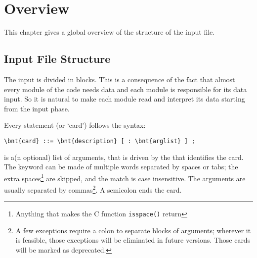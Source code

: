 %
%
%
%
%
% 
%
%

\chapter{Overview}\label{sec:OVERVIEW}
This chapter gives a global overview of the structure of the input file.


\section{Input File Structure}
The input is divided in blocks.
This is a consequence of the fact that almost every module of the code 
needs data and each module is responsible for its data input. 
So it is natural to make each module read and interpret its data starting 
from the input phase.

Every statement (or `card') follows the syntax:
\begin{Verbatim}[commandchars=\\\{\}]
    \bnt{card} ::= \bnt{description} [ : \bnt{arglist} ] ;
\end{Verbatim}
 is a(n optional) list of arguments, that is driven by the 
 that identifies the card. 
The keyword can be made of multiple words separated by spaces or tabs; 
the extra spaces\footnote{
	Anything that makes the C function \texttt{isspace()} 
	return 
} are skipped, and the match is case insensitive. 
The arguments are usually separated by commas\footnote{
	A few exceptions require a colon to separate blocks of arguments;
	wherever it is feasible, those exceptions will be eliminated 
	in future versions.
	Those cards will be marked as deprecated.
}.
A semicolon ends the card. 

